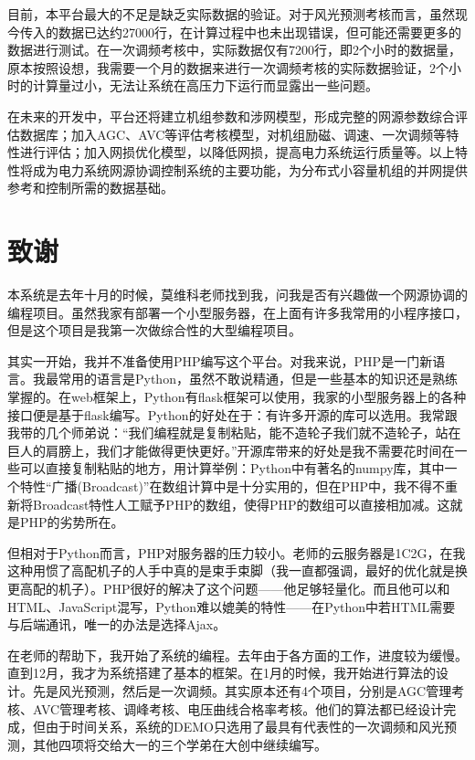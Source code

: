\documentclass[winfonts,UTF8,a4paper]{ctexart}
\begin{document}
目前，本平台最大的不足是缺乏实际数据的验证。对于风光预测考核而言，虽然现今传入的数据已达约27000行，在计算过程中也未出现错误，但可能还需要更多的数据进行测试。在一次调频考核中，实际数据仅有7200行，即2个小时的数据量，原本按照设想，我需要一个月的数据来进行一次调频考核的实际数据验证，2个小时的计算量过小，无法让系统在高压力下运行而显露出一些问题。


在未来的开发中，平台还将建立机组参数和涉网模型，形成完整的网源参数综合评估数据库；加入AGC、AVC等评估考核模型，对机组励磁、调速、一次调频等特性进行评估；加入网损优化模型，以降低网损，提高电力系统运行质量等。以上特性将成为电力系统网源协调控制系统的主要功能，为分布式小容量机组的并网提供参考和控制所需的数据基础。

\appendix
%	
\newpage
\section*{致谢}
本系统是去年十月的时候，莫维科老师找到我，问我是否有兴趣做一个网源协调的编程项目。虽然我家有部署一个小型服务器，在上面有许多我常用的小程序接口，但是这个项目是我第一次做综合性的大型编程项目。

其实一开始，我并不准备使用PHP编写这个平台。对我来说，PHP是一门新语言。我最常用的语言是Python，虽然不敢说精通，但是一些基本的知识还是熟练掌握的。在web框架上，Python有flask框架可以使用，我家的小型服务器上的各种接口便是基于flask编写。Python的好处在于：有许多开源的库可以选用。我常跟我带的几个师弟说：“我们编程就是复制粘贴，能不造轮子我们就不造轮子，站在巨人的肩膀上，我们才能做得更快更好。”开源库带来的好处是我不需要花时间在一些可以直接复制粘贴的地方，用计算举例：Python中有著名的numpy库，其中一个特性“广播(Broadcast)”在数组计算中是十分实用的，但在PHP中，我不得不重新将Broadcast特性人工赋予PHP的数组，使得PHP的数组可以直接相加减。这就是PHP的劣势所在。

但相对于Python而言，PHP对服务器的压力较小。老师的云服务器是1C2G，在我这种用惯了高配机子的人手中真的是束手束脚（我一直都强调，最好的优化就是换更高配的机子）。PHP很好的解决了这个问题——他足够轻量化。而且他可以和HTML、JavaScript混写，Python难以媲美的特性——在Python中若HTML需要与后端通讯，唯一的办法是选择Ajax。

在老师的帮助下，我开始了系统的编程。去年由于各方面的工作，进度较为缓慢。直到12月，我才为系统搭建了基本的框架。在1月的时候，我开始进行算法的设计。先是风光预测，然后是一次调频。其实原本还有4个项目，分别是AGC管理考核、AVC管理考核、调峰考核、电压曲线合格率考核。他们的算法都已经设计完成，但由于时间关系，系统的DEMO只选用了最具有代表性的一次调频和风光预测，其他四项将交给大一的三个学弟在大创中继续编写。
\end{document}
